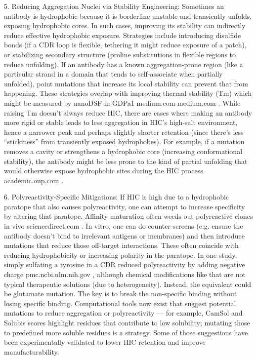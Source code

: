 \documentclass[12pt]{article}
\begin{document}
5. Reducing Aggregation Nuclei via Stability Engineering: Sometimes an antibody is hydrophobic because it is borderline unstable and transiently unfolds, exposing hydrophobic cores. In such cases, improving its stability can indirectly reduce effective hydrophobic exposure. Strategies include introducing disulfide bonds (if a CDR loop is flexible, tethering it might reduce exposure of a patch), or stabilizing secondary structure (proline substitutions in flexible regions to reduce unfolding). If an antibody has a known aggregation-prone region (like a particular strand in a domain that tends to self-associate when partially unfolded), point mutations that increase its local stability can prevent that from happening. These strategies overlap with improving thermal stability (Tm) which might be measured by nanoDSF in GDPa1
medium.com
medium.com
. While raising Tm doesn’t always reduce HIC, there are cases where making an antibody more rigid or stable leads to less aggregation in HIC’s high-salt environment, hence a narrower peak and perhaps slightly shorter retention (since there’s less “stickiness” from transiently exposed hydrophobes). For example, if a mutation removes a cavity or strengthens a hydrophobic core (increasing conformational stability), the antibody might be less prone to the kind of partial unfolding that would otherwise expose hydrophobic sites during the HIC process
academic.oup.com
.

6. Polyreactivity-Specific Mitigations: If HIC is high due to a hydrophobic paratope that also causes polyreactivity, one can attempt to increase specificity by altering that paratope. Affinity maturation often weeds out polyreactive clones in vivo
sciencedirect.com
. In vitro, one can do counter-screens (e.g. ensure the antibody doesn’t bind to irrelevant antigens or membranes) and then introduce mutations that reduce those off-target interactions. These often coincide with reducing hydrophobicity or increasing polarity in the paratope. In one study, simply sulfating a tyrosine in a CDR reduced polyreactivity by adding negative charge
pmc.ncbi.nlm.nih.gov
, although chemical modifications like that are not typical therapeutic solutions (due to heterogeneity). Instead, the equivalent could be glutamate mutation. The key is to break the non-specific binding without losing specific binding. Computational tools now exist that suggest potential mutations to reduce aggregation or polyreactivity — for example, CamSol and Solubis scores highlight residues that contribute to low solubility; mutating those to predefined more soluble residues is a strategy. Some of those suggestions have been experimentally validated to lower HIC retention and improve manufacturability.
\end{document}

